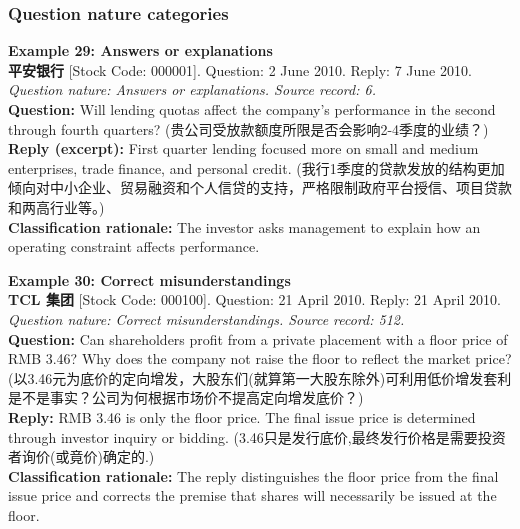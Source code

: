 \clearpage
\subsubsection*{Question nature categories}

\noindent \textbf{Example 29: Answers or explanations} \\
\textbf{平安银行} [Stock Code: 000001]. Question: 2 June 2010. Reply: 7 June 2010. \\
\textit{Question nature: Answers or explanations. Source record: 6.} \\
\textbf{Question:} Will lending quotas affect the company's performance in the second through fourth quarters? (贵公司受放款额度所限是否会影响2-4季度的业绩？) \\
\textbf{Reply (excerpt):} First quarter lending focused more on small and medium enterprises, trade finance, and personal credit. (我行1季度的贷款发放的结构更加倾向对中小企业、贸易融资和个人信贷的支持，严格限制政府平台授信、项目贷款和两高行业等。) \\
\textbf{Classification rationale:} The investor asks management to explain how an operating constraint affects performance.

\vspace{0.4cm}
\noindent \textbf{Example 30: Correct misunderstandings} \\
\textbf{TCL 集团} [Stock Code: 000100]. Question: 21 April 2010. Reply: 21 April 2010. \\
\textit{Question nature: Correct misunderstandings. Source record: 512.} \\
\textbf{Question:} Can shareholders profit from a private placement with a floor price of RMB 3.46? Why does the company not raise the floor to reflect the market price? (以3.46元为底价的定向增发，大股东们(就算第一大股东除外)可利用低价增发套利是不是事实？公司为何根据市场价不提高定向增发底价？) \\
\textbf{Reply:} RMB 3.46 is only the floor price. The final issue price is determined through investor inquiry or bidding. (3.46只是发行底价,最终发行价格是需要投资者询价(或竟价)确定的.) \\
\textbf{Classification rationale:} The reply distinguishes the floor price from the final issue price and corrects the premise that shares will necessarily be issued at the floor.

